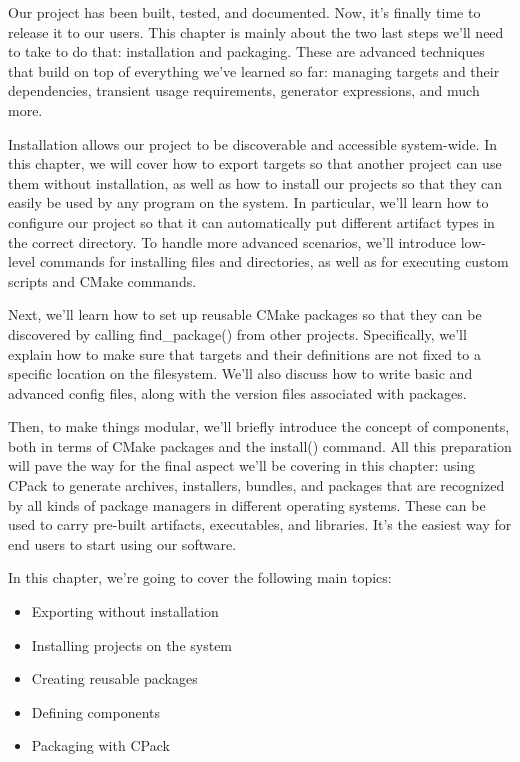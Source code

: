 
Our project has been built, tested, and documented. Now, it's finally time to release it to our users. This chapter is mainly about the two last steps we'll need to take to do that: installation and packaging. These are advanced techniques that build on top of everything we've learned so far: managing targets and their dependencies, transient usage requirements, generator expressions, and much more.

Installation allows our project to be discoverable and accessible system-wide. In this chapter, we will cover how to export targets so that another project can use them without installation, as well as how to install our projects so that they can easily be used by any program on the system. In particular, we'll learn how to configure our project so that it can automatically put different artifact types in the correct directory. To handle more advanced scenarios, we'll introduce low-level commands for installing files and directories, as well as for executing custom scripts and CMake commands.

Next, we'll learn how to set up reusable CMake packages so that they can be discovered by calling find\_package() from other projects. Specifically, we'll explain how to make sure that targets and their definitions are not fixed to a specific location on the filesystem. We'll also discuss how to write basic and advanced config files, along with the version files associated with packages.

Then, to make things modular, we'll briefly introduce the concept of components, both in terms of CMake packages and the install() command. All this preparation will pave the way for the final aspect we'll be covering in this chapter: using CPack to generate archives, installers, bundles, and packages that are recognized by all kinds of package managers in different operating systems. These can be used to carry pre-built artifacts, executables, and libraries. It's the easiest way for end users to start using our software.

In this chapter, we're going to cover the following main topics:

\begin{itemize}
\item 
Exporting without installation

\item 
Installing projects on the system

\item 
Creating reusable packages

\item 
Defining components

\item 
Packaging with CPack
\end{itemize}









